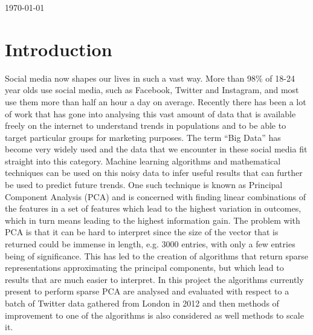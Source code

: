 \documentclass[11pt,a4paper]{article}
\begin{document}
\begin{titlepage}

{\large \today}\\[3cm] %

\vfill %

\end{titlepage}





\newpage




\tableofcontents
\newpage
{}

\section{Introduction}
Social media now shapes our lives in such a vast way. More than $98\%$ of 18-24 year olds use social media, such as Facebook, Twitter and Instagram, and most use them more than half an hour a day on average\cite{statbrain}. Recently there has been a lot of work that has gone into analysing this vast amount of data that is available freely on the internet to understand trends in populations and to be able to target particular groups for marketing purposes. The term ``Big Data'' has become very widely used and the data that we encounter in these social media fit straight into this category. Machine learning algorithms and mathematical techniques can be used on this noisy data to infer useful results that can further be used to predict future trends. 
One such technique is known as Principal Component Analysis (PCA) and is concerned with finding linear combinations of the features in a set of features which lead to the highest variation in outcomes, which in turn means leading to the highest information gain. The problem with PCA is that it can be hard to interpret since the size of the vector that is returned could be immense in length, e.g. 3000 entries, with only a few entries being of significance. This has led to the creation of algorithms that return sparse representations approximating the principal components, but which lead to results that are much easier to interpret. In this project the algorithms currently present to perform sparse PCA are analysed and evaluated with respect to a batch of Twitter data gathered from London in 2012 and then methods of improvement to one of the algorithms is also considered as well methods to scale it. 
\end{document}
